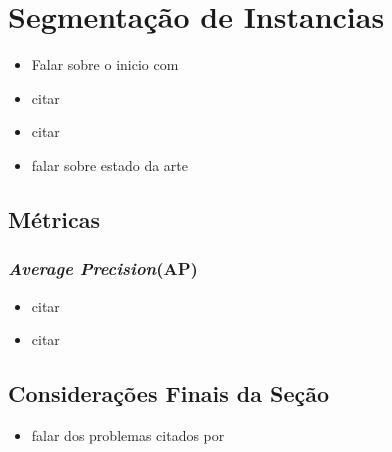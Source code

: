 \newpage
\section{Segmentação de Instancias}
\label{instance:instance}
\begin{itemize}
    \item Falar sobre o inicio com \cite{Vaillant1994}
    \item citar \cite{Minaee2021}
    \item citar \cite{Bolya2019}
    \item falar sobre estado da arte \cite{Hafiz2020}
\end{itemize}

\subsection{Métricas}
\subsubsection{\textit{Average Precision}(AP)}
\label{instance:AP}
\begin{itemize}
    \item citar \cite{Hariharan2014}
    \item citar \cite{Lin2014}
\end{itemize}


\subsection{Considerações Finais da Seção}
\begin{itemize}
    \item falar dos problemas citados por \cite{Kirillov2019a}
\end{itemize}
